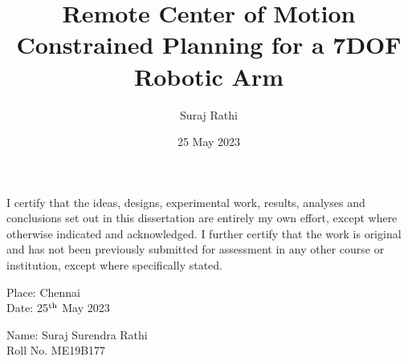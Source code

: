 \documentclass[BTech]{iitmdiss}
\begin{document}
    \newcommand{\titleText}{Remote Center of Motion Constrained Planning for a 7DOF Robotic Arm}
    \newcommand{\authorText}{Suraj Rathi}
    \title{\titleText}

    \author{\authorText}

    \date{25 May 2023}

    \maketitle

    \declaration

    \vspace*{0.5in}

    \noindent I certify that the ideas, designs, experimental work, results, analyses and conclusions set out in this
    dissertation are entirely my own effort, except where otherwise indicated and acknowledged.
    I further certify that the work is original and has not been previously submitted for assessment in
    any other course or institution, except where specifically stated.

    \vspace*{1.5in}


    \begin{paracol}{2}
        \begin{singlespacing}
            \hspace*{-0.25in}
            \parbox{2.5in}{
                \noindent Place: Chennai\\
            Date: 25$^{\textnormal{th}}$ May 2023
            }
        \end{singlespacing}

        \switchcolumn
        \begin{singlespacing}
            \hspace*{-0.25in}
            \parbox{2.5in}{
                \noindent Name: Suraj Surendra Rathi \\
                \noindent Roll No. ME19B177
            }


        \end{singlespacing}

    \end{paracol}
\end{document}
